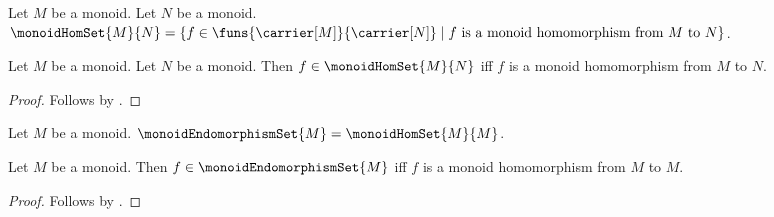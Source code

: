 \begin{definition}\label{monoid_hom_set}
    Let $M$ be a monoid.
    Let $N$ be a monoid.
    $\monoidHomSet{M}{N}=
        \{f\in\funs{\carrier[M]}{\carrier[N]}\mid
            \text{$f$ is a monoid homomorphism from $M$ to $N$}\}$.
\end{definition}

\begin{proposition}\label{monoid_hom_set_iff}
    Let $M$ be a monoid.
    Let $N$ be a monoid.
    Then $f\in\monoidHomSet{M}{N}$ iff
        $f$ is a monoid homomorphism from $M$ to $N$.
\end{proposition}
\begin{proof}
    Follows by
        .
\end{proof}

\begin{definition}\label{monoid_endomorphism_set}
    Let $M$ be a monoid.
    $\monoidEndomorphismSet{M}=\monoidHomSet{M}{M}$.
\end{definition}

\begin{proposition}\label{monoid_endomorphism_set_iff}
    Let $M$ be a monoid.
    Then $f\in\monoidEndomorphismSet{M}$ iff
        $f$ is a monoid homomorphism from $M$ to $M$.
\end{proposition}
\begin{proof}
    Follows by
        .
\end{proof}
